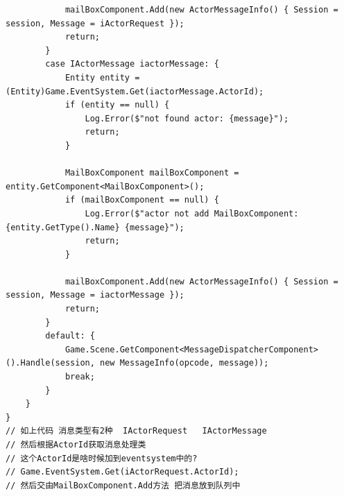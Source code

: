 \documentclass[9pt, b5paper]{article}
\begin{document}
\begin{verbatim}
            mailBoxComponent.Add(new ActorMessageInfo() { Session = session, Message = iActorRequest });
            return;
        }
        case IActorMessage iactorMessage: {
            Entity entity = (Entity)Game.EventSystem.Get(iactorMessage.ActorId);
            if (entity == null) {
                Log.Error($"not found actor: {message}");
                return;
            }

            MailBoxComponent mailBoxComponent = entity.GetComponent<MailBoxComponent>();
            if (mailBoxComponent == null) {
                Log.Error($"actor not add MailBoxComponent: {entity.GetType().Name} {message}");
                return;
            }

            mailBoxComponent.Add(new ActorMessageInfo() { Session = session, Message = iactorMessage });
            return;
        }
        default: {
            Game.Scene.GetComponent<MessageDispatcherComponent>().Handle(session, new MessageInfo(opcode, message));
            break;
        }
    }
}
// 如上代码 消息类型有2种  IActorRequest   IActorMessage
// 然后根据ActorId获取消息处理类
// 这个ActorId是啥时候加到eventsystem中的?
// Game.EventSystem.Get(iActorRequest.ActorId);
// 然后交由MailBoxComponent.Add方法 把消息放到队列中
\end{verbatim}
\end{document}
